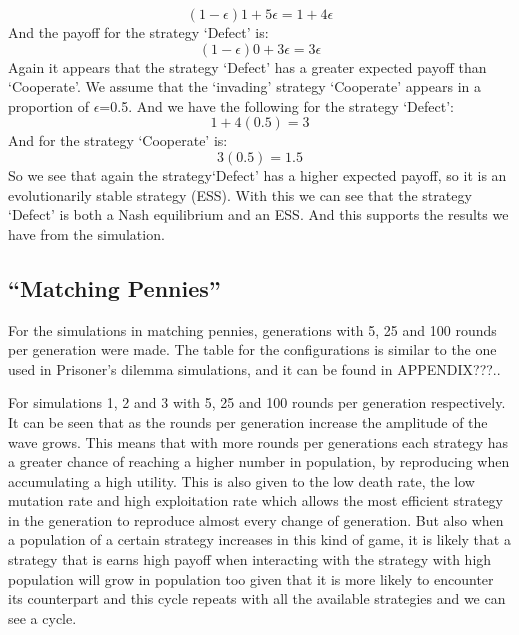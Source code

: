 \documentclass{book}
\begin{document}
\begin{equation}
(1-{\epsilon})1 + 5{\epsilon} = 1 + 4{\epsilon}
\end{equation}
And the payoff for the strategy `Defect' is:
\begin{equation}
(1-{\epsilon})0 + 3{\epsilon} =  3{\epsilon}
\end{equation}
Again it appears that the strategy `Defect' has a greater expected payoff than `Cooperate'. We assume that the `invading' strategy `Cooperate' appears in a proportion of $\epsilon$=0.5. And we have the following for the strategy `Defect':
\begin{equation}
1 +  4(0.5) = 3
\end{equation}
And for the strategy `Cooperate' is:
\begin{equation}
 3(0.5) = 1.5
\end{equation}
So we see that again the strategy`Defect' has a higher expected payoff, so it is an evolutionarily stable strategy (ESS).
With this we can see that the strategy `Defect' is both a Nash equilibrium and an ESS. And this supports the results we have from the simulation.


\subsection{``Matching Pennies''}

For the simulations in matching pennies, generations with 5, 25 and 100 rounds per generation were made.  The table for the configurations is similar to the one used in Prisoner's dilemma simulations, and it can be found in APPENDIX???..


For simulations 1, 2 and 3 with 5, 25 and 100 rounds per generation respectively. It can be seen that as the rounds per generation increase the amplitude of the wave grows. This means that with more rounds per generations each strategy has a greater chance of reaching a higher number in population, by reproducing when accumulating a high utility. This is also given to the low death rate, the low mutation rate and high exploitation rate which allows the most efficient strategy in the generation to reproduce almost every change of generation. But also when a population of a certain strategy increases in this kind of game, it is likely that a strategy that is  earns high payoff when interacting with the strategy with high population will grow in population too given that it is more likely to encounter its counterpart and this cycle repeats with all the available strategies and we can see a cycle. 
\end{document}
